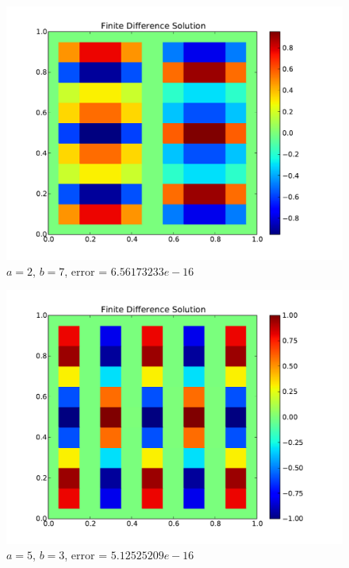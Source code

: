 \documentclass[10pt,letterpaper]{article}
\begin{document}
\begin{figure}[p]
\begin{center}
\includegraphics[width=5in,keepaspectratio]{a27.pdf}
\end{center}
\caption{$a=2$, $b=7$, error = $6.56173233e-16$}
\end{figure}

\begin{figure}[p]
\begin{center}
\includegraphics[width=5in,keepaspectratio]{a53.pdf}
\end{center}
\caption{$a=5$, $b=3$, error = $5.12525209e-16$}
\end{figure}
\end{document}
